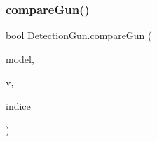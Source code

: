 \mbox{\label{class_detection_gun_a0ca849e6a37b8734261999c4f8f64523}} 
\subsubsection{\texorpdfstring{compare\+Gun()}{compareGun()}}
{\footnotesize\ttfamily bool Detection\+Gun.\+compare\+Gun (\begin{DoxyParamCaption}\item[{List$<$ \mbox{\hyperlink{class_list_vector_gun}{List\+Vector\+Gun}} $>$}]{model,  }\item[{\mbox{\hyperlink{class_list_vector_gun}{List\+Vector\+Gun}}}]{v,  }\item[{int}]{indice }\end{DoxyParamCaption})\hspace{0.3cm}{\ttfamily [inline]}}






